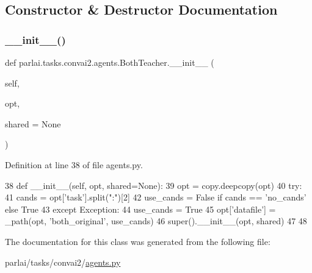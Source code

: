 \subsection{Constructor \& Destructor Documentation}
\mbox{\label{classparlai_1_1tasks_1_1convai2_1_1agents_1_1BothTeacher_acae96b99b1aa547acb06ee854936e50b}} 
\subsubsection{\texorpdfstring{\+\_\+\+\_\+init\+\_\+\+\_\+()}{\_\_init\_\_()}}
{\footnotesize\ttfamily def parlai.\+tasks.\+convai2.\+agents.\+Both\+Teacher.\+\_\+\+\_\+init\+\_\+\+\_\+ (\begin{DoxyParamCaption}\item[{}]{self,  }\item[{}]{opt,  }\item[{}]{shared = {\ttfamily None} }\end{DoxyParamCaption})}



Definition at line 38 of file agents.\+py.


\begin{DoxyCode}
38     \textcolor{keyword}{def }\_\_init\_\_(self, opt, shared=None):
39         opt = copy.deepcopy(opt)
40         \textcolor{keywordflow}{try}:
41             cands = opt[\textcolor{stringliteral}{'task'}].split(\textcolor{stringliteral}{":"})[2]
42             use\_cands = \textcolor{keyword}{False} \textcolor{keywordflow}{if} cands == \textcolor{stringliteral}{'no\_cands'} \textcolor{keywordflow}{else} \textcolor{keyword}{True}
43         \textcolor{keywordflow}{except} Exception:
44             use\_cands = \textcolor{keyword}{True}
45         opt[\textcolor{stringliteral}{'datafile'}] = \_path(opt, \textcolor{stringliteral}{'both\_original'}, use\_cands)
46         super().\_\_init\_\_(opt, shared)
47 
48 
\end{DoxyCode}


The documentation for this class was generated from the following file\+:\begin{DoxyCompactItemize}
\item 
parlai/tasks/convai2/\hyperlink{parlai_2tasks_2convai2_2agents_8py}{agents.\+py}\end{DoxyCompactItemize}

